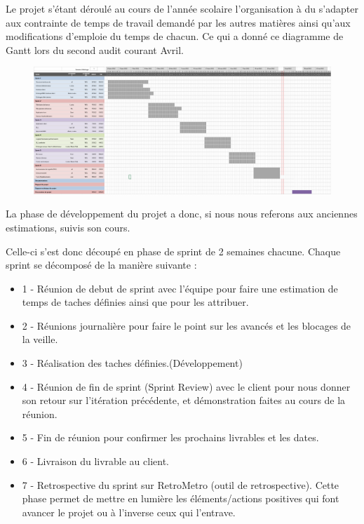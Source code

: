 Le projet s'étant déroulé au cours de l'année scolaire l'organisation à du s'adapter aux
contrainte de temps de travail demandé par les autres matières ainsi qu'aux modifications d'emploie
du temps de chacun. Ce qui a donné ce diagramme de Gantt lors du second audit courant Avril.

\begin{figure}[!h]
	\centering
	\includegraphics[width=15cm]{Gantt.png}
\end{figure}

La phase de développement du projet a donc, si nous nous referons aux anciennes estimations, suivis son cours.\newline

Celle-ci s'est donc découpé en phase de sprint de 2 semaines chacune. Chaque sprint se décomposé de la manière suivante :\newline  

\begin{itemize}
	\item 1 - Réunion de debut de sprint avec l'équipe pour faire une estimation de temps de taches définies ainsi que pour les attribuer.\newline
	\item 2 - Réunions journalière pour faire le point sur les avancés et les blocages de la veille.\newline
	\item 3 - Réalisation des taches définies.(Développement)\newline
	\item 4 - Réunion de fin de sprint (Sprint Review) avec le client pour nous donner son retour sur l'itération précédente, et démonstration faites au cours de la réunion.\newline
	\item 5 - Fin de réunion pour confirmer les prochains livrables et les dates.\newline
	\item 6 - Livraison du livrable au client.\newline
	\item 7 - Retrospective du sprint sur RetroMetro (outil de retrospective). Cette phase permet de mettre en lumière les éléments/actions positives qui font avancer le projet ou à l'inverse ceux qui l'entrave. 
\end{itemize}

